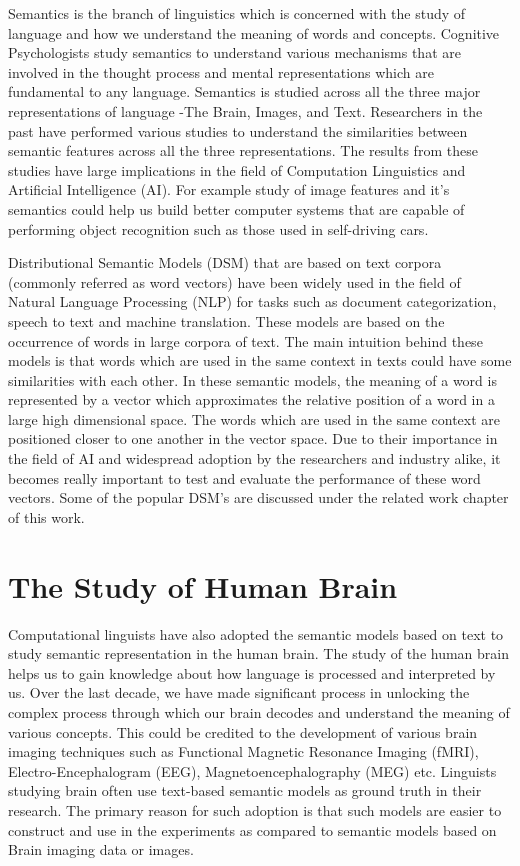 \label{chapter:introduction}

Semantics is the branch of linguistics which is concerned with the study of language and how we understand the meaning of words and concepts. Cognitive Psychologists study semantics to understand various mechanisms that are involved in the thought process and mental representations which are fundamental to any language. 
Semantics is studied across all the three major representations of language -The Brain, Images, and Text. Researchers in the past have performed various studies to understand the similarities between semantic features across all the three representations. The results from these studies have large implications in the field of Computation Linguistics and Artificial Intelligence (AI). For example study of image features and it's semantics could help us build better computer systems that are capable of performing object recognition such as those used in self-driving cars. 

Distributional Semantic Models (DSM) that are based on text corpora (commonly referred as word vectors) have been widely used in the field of Natural Language Processing (NLP) for tasks such as document categorization, speech to text and machine translation. These models are based on the occurrence of words in large corpora of text. The main intuition behind these models is that words which are used in the same context in texts could have some similarities with each other. In these semantic models, the meaning of a word is represented by a vector which approximates the relative position of a word in a large high dimensional space. The words which are used in the same context are positioned closer to one another in the vector space. Due to their importance in the field of AI and widespread adoption by the researchers and industry alike, it becomes really important to test and evaluate the performance of these word vectors. Some of the popular DSM's are discussed under the related work chapter of this work.

\section{The Study of Human Brain}
Computational linguists have also adopted the semantic models based on text to study semantic representation in the human brain. The study of the human brain helps us to gain knowledge about how language is processed and interpreted by us. Over the last decade, we have made significant process in unlocking the complex process through which our brain decodes and understand the meaning of various concepts. This could be credited to the development of various brain imaging techniques such as Functional Magnetic Resonance Imaging (fMRI), Electro-Encephalogram (EEG), Magnetoencephalography (MEG) etc. Linguists studying brain often use text-based semantic models as ground truth in their research. The primary reason for such adoption is that such models are easier to construct and use in the experiments as compared to semantic models based on Brain imaging data or images.

